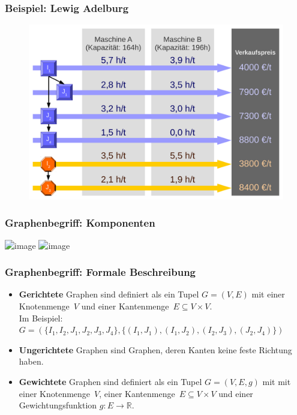 
\begin{frame}
 \frametitle{Beispiel: Lewig Adelburg}
 \begin{figure}
  \centering
  \includegraphics[width=\linewidth]{Bilder/LewigAdelburg}
 \end{figure}
\end{frame}

\begin{frame}
 \frametitle{Graphenbegriff: Komponenten}
 \begin{center}
  \includegraphics<1>[width=.7\linewidth,page=1]{Bilder/Graph_Lewig_Adelburg}
  \includegraphics<2>[width=.7\linewidth,page=2]{Bilder/Graph_Lewig_Adelburg}
 \end{center}
\end{frame}

\begin{frame}
 \frametitle{Graphenbegriff: Formale Beschreibung}
 \begin{itemize}
  \item \textbf{Gerichtete} Graphen sind definiert als ein Tupel $G=(V, E)$ mit einer Knotenmenge~$V$ und einer Kantenmenge~$E\subseteq V\times V$.\\[1ex]
    Im Beispiel:\\{\footnotesize $G = (\{I_1, I_2, J_1, J_2, J_3, J_4\}, \{(I_1, J_1), (I_1, J_2), (I_2, J_3), (J_2, J_4)\})$}
  \item \textbf{Ungerichtete} Graphen sind Graphen, deren Kanten keine feste Richtung haben.
  \item \textbf{Gewichtete} Graphen sind definiert als ein Tupel $G=(V, E, g)$ mit  mit einer Knotenmenge~$V$, einer Kantenmenge~$E\subseteq V\times V$ und einer Gewichtungsfunktion $g:E\rightarrow\mathbb{R}$.
 \end{itemize}
\end{frame}
